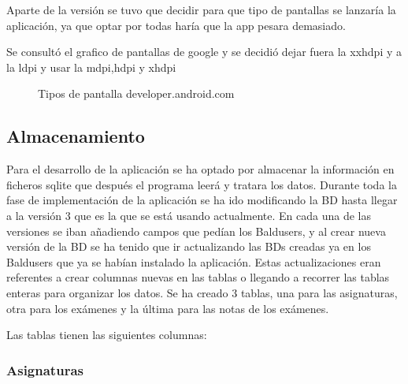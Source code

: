 Aparte de la versión se tuvo que decidir para que tipo de pantallas se lanzaría la aplicación, ya que optar por todas haría que la app pesara demasiado.

Se consultó el grafico de pantallas de google y se decidió dejar fuera la xxhdpi y a la ldpi y usar la mdpi,hdpi y xhdpi

\begin{figure}[H] 
  \begin{center} 
    \caption{Tipos de pantalla developer.android.com} 
    \label{fig:TiposPantalla} 
  \end{center} 
\end{figure}

\subsection{Almacenamiento}
\label{subsecc:Almacenamiento}

Para el desarrollo de la aplicación se ha optado por almacenar la información en ficheros sqlite que después el programa leerá y tratara los datos. 
Durante toda la fase de implementación de la aplicación se ha ido modificando la BD hasta llegar a la versión 3 que es la que se está usando actualmente.
En cada una de las versiones se iban añadiendo campos que pedían los Baldusers, y al crear nueva versión de la BD se ha tenido que ir actualizando las BDs creadas ya en los Baldusers que ya se habían instalado la aplicación.
Estas actualizaciones eran referentes a crear columnas nuevas en las tablas o llegando a recorrer las tablas enteras para organizar los datos.
Se ha creado 3 tablas, una para las asignaturas, otra para los exámenes y la última para las notas de los exámenes.

Las tablas tienen las siguientes columnas:
\subsubsection{Asignaturas}
\label{subsubsecc:Asignaturas}


